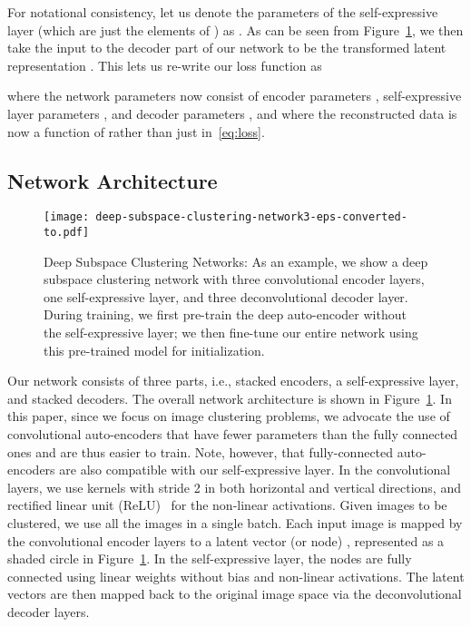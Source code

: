 \documentclass{article}
\begin{document}
For notational consistency, let us denote the parameters of the self-expressive layer (which are just the elements of ) as . As can be seen from Figure~\ref{fig:dscn}, we then take the input to the decoder part of our network to be the transformed latent representation . This lets us re-write our loss function as

where the network parameters  now consist of encoder parameters , self-expressive layer parameters , and decoder parameters , and where the reconstructed data  is now a function of  rather than just  in~\eqref{eq:loss}.


\subsection{Network Architecture}

\begin{figure}[!t]
\centering
\texttt{[image: deep-subspace-clustering-network3-eps-converted-to.pdf]}
\caption{Deep Subspace Clustering Networks: As an example, we show a deep subspace clustering network with three convolutional encoder layers, one self-expressive layer, and three deconvolutional decoder layer. During training, we first pre-train the deep auto-encoder without the self-expressive layer; we then fine-tune our entire network using this pre-trained model for initialization.}\label{fig:dscn}
\vspace{-0.4cm}
\end{figure}

Our network consists of three parts, i.e., stacked encoders, a self-expressive layer, and stacked decoders. The overall network architecture is shown in Figure~\ref{fig:dscn}.
In this paper, since we focus on image clustering problems, we advocate the use of convolutional auto-encoders that have fewer parameters than the fully connected ones and are thus easier to train. Note, however, that fully-connected auto-encoders are also compatible with our self-expressive layer. In the convolutional layers, we use kernels with stride 2 in both horizontal and vertical directions, and rectified linear unit (ReLU)~\cite{krizhevsky2012imagenet} for the non-linear activations. Given  images to be clustered, we use all the images in a single batch. 
Each input image is mapped by the convolutional encoder layers to a latent vector (or node) , represented as a shaded circle in Figure~\ref{fig:dscn}. 
In the self-expressive layer, the nodes are fully connected using linear weights without bias and non-linear activations. The latent vectors are then mapped back to the original image space via the deconvolutional decoder layers.
\end{document}
